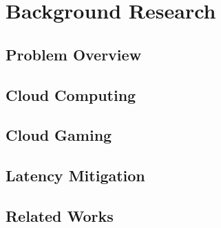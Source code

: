 \chapter{Background Research}
\label{chapter2}

\section{Problem Overview}
\lipsum[1-1]

\section{Cloud Computing}
\lipsum[1-1]

\section{Cloud Gaming}
\lipsum[1-1]

\section{Latency Mitigation}
\lipsum[1-1]

\section{Related Works}
\lipsum[1-1]